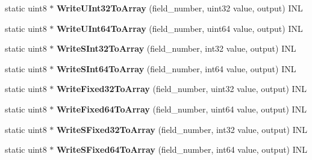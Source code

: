 \begin{DoxyCompactItemize}
static uint8 $\ast$ {\bfseries Write\+U\+Int32\+To\+Array} (field\+\_\+number, uint32 value, output) I\+NL
\item 
\mbox{\label{classgoogle_1_1protobuf_1_1internal_1_1WireFormatLite_a61a86b37d65dc7cec00b312d33715fb4}} 
static uint8 $\ast$ {\bfseries Write\+U\+Int64\+To\+Array} (field\+\_\+number, uint64 value, output) I\+NL
\item 
\mbox{\label{classgoogle_1_1protobuf_1_1internal_1_1WireFormatLite_a236e386b8ab32786b9d5bbf9e2920693}} 
static uint8 $\ast$ {\bfseries Write\+S\+Int32\+To\+Array} (field\+\_\+number, int32 value, output) I\+NL
\item 
\mbox{\label{classgoogle_1_1protobuf_1_1internal_1_1WireFormatLite_ab7b8b74a4165b92438f567c15e59d812}} 
static uint8 $\ast$ {\bfseries Write\+S\+Int64\+To\+Array} (field\+\_\+number, int64 value, output) I\+NL
\item 
\mbox{\label{classgoogle_1_1protobuf_1_1internal_1_1WireFormatLite_adb2a8bbffc8731b3cbeceab8a8aff2ae}} 
static uint8 $\ast$ {\bfseries Write\+Fixed32\+To\+Array} (field\+\_\+number, uint32 value, output) I\+NL
\item 
\mbox{\label{classgoogle_1_1protobuf_1_1internal_1_1WireFormatLite_ad45cef4f9fd786012ab89f01753a0801}} 
static uint8 $\ast$ {\bfseries Write\+Fixed64\+To\+Array} (field\+\_\+number, uint64 value, output) I\+NL
\item 
\mbox{\label{classgoogle_1_1protobuf_1_1internal_1_1WireFormatLite_a6ded70e3ff6dee8b17f7aea4be0777db}} 
static uint8 $\ast$ {\bfseries Write\+S\+Fixed32\+To\+Array} (field\+\_\+number, int32 value, output) I\+NL
\item 
\mbox{\label{classgoogle_1_1protobuf_1_1internal_1_1WireFormatLite_ae85b59da7c6aa7930e77730ffc1a63b8}} 
static uint8 $\ast$ {\bfseries Write\+S\+Fixed64\+To\+Array} (field\+\_\+number, int64 value, output) I\+NL

\end{DoxyCompactItemize}
